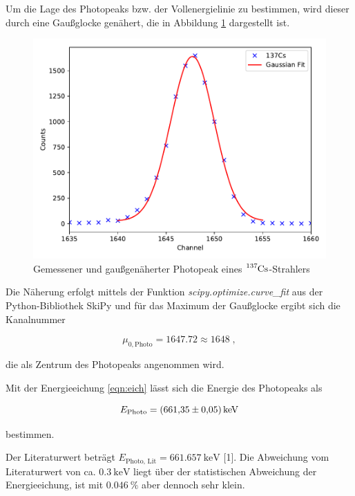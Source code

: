 Um die Lage des Photopeaks bzw. der Vollenergielinie zu bestimmen, wird dieser durch eine Gaußglocke genähert, die in Abbildung
\ref{fig:plot22} dargestellt ist.

\begin{figure}
  \centering
  \includegraphics[scale=0.7]{content/plot22.pdf}
  \caption{Gemessener und gaußgenäherter Photopeak eines $\ce{^{137}Cs}$-Strahlers}
  \label{fig:plot22}
\end{figure}

Die Näherung erfolgt mittels der Funktion \textit{scipy.optimize.curve\_fit} aus der Python-Bibliothek SkiPy und für
das Maximum der Gaußglocke ergibt sich die Kanalnummer

\begin{equation*}
  \mu_{0,\text{Photo}} = \num{1647.72} \approx \num{1648} \; ,
\end{equation*}

die als Zentrum des Photopeaks angenommen wird.

Mit der Energieeichung \eqref{eqn:eich} lässt sich die Energie des Photopeaks als

\begin{equation*}
  E_\text{Photo} = \SI{661.35 +- 0.05}{\kilo\eV}
\end{equation*}

bestimmen.

Der Literaturwert beträgt $E_\text{Photo, Lit} = \SI{661.657}{\kilo\eV}$ [1]. Die Abweichung vom Literaturwert 
von ca. $\SI{0.3}{\kilo\eV}$ liegt über der statistischen Abweichung der Energieeichung, 
ist mit $\SI{0.046}{\percent}$ aber dennoch sehr klein.

